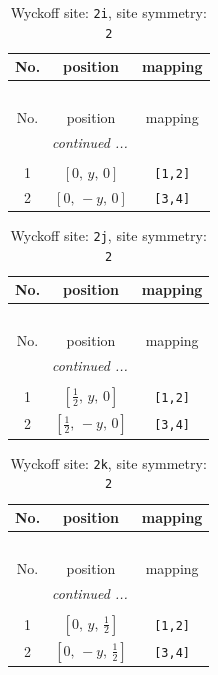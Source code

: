 \documentclass[fleqn,8pt]{jsarticle}
\begin{document}
\renewcommand{\arraystretch}{1.2}
\begin{longtable}{ccc}
\caption{Wyckoff site: {\tt 2i}, site symmetry: {\tt 2}}
 \\
 \hline \hline
No. & position & mapping \\ \hline \endfirsthead

\multicolumn{2}{l}{\tablename\ \thetable{}} \\
 \hline \hline
No. & position & mapping \\ \hline \endhead

 \hline \hline
\multicolumn{2}{r}{\footnotesize\it continued ...} \\ \endfoot

 \hline \hline
\multicolumn{2}{r}{} \\ \endlastfoot

1 & $\left[ 0,\, y,\, 0 \right]$ & {\tt [1,2]} \\ \hline
2 & $\left[ 0,\, - y,\, 0 \right]$ & {\tt [3,4]} \\
\end{longtable}
\renewcommand{\arraystretch}{1.2}
\begin{longtable}{ccc}
\caption{Wyckoff site: {\tt 2j}, site symmetry: {\tt 2}}
 \\
 \hline \hline
No. & position & mapping \\ \hline \endfirsthead

\multicolumn{2}{l}{\tablename\ \thetable{}} \\
 \hline \hline
No. & position & mapping \\ \hline \endhead

 \hline \hline
\multicolumn{2}{r}{\footnotesize\it continued ...} \\ \endfoot

 \hline \hline
\multicolumn{2}{r}{} \\ \endlastfoot

1 & $\left[ \frac{1}{2},\, y,\, 0 \right]$ & {\tt [1,2]} \\ \hline
2 & $\left[ \frac{1}{2},\, - y,\, 0 \right]$ & {\tt [3,4]} \\
\end{longtable}
\renewcommand{\arraystretch}{1.2}
\begin{longtable}{ccc}
\caption{Wyckoff site: {\tt 2k}, site symmetry: {\tt 2}}
 \\
 \hline \hline
No. & position & mapping \\ \hline \endfirsthead

\multicolumn{2}{l}{\tablename\ \thetable{}} \\
 \hline \hline
No. & position & mapping \\ \hline \endhead

 \hline \hline
\multicolumn{2}{r}{\footnotesize\it continued ...} \\ \endfoot

 \hline \hline
\multicolumn{2}{r}{} \\ \endlastfoot

1 & $\left[ 0,\, y,\, \frac{1}{2} \right]$ & {\tt [1,2]} \\ \hline
2 & $\left[ 0,\, - y,\, \frac{1}{2} \right]$ & {\tt [3,4]} \\
\end{longtable}
\end{document}
